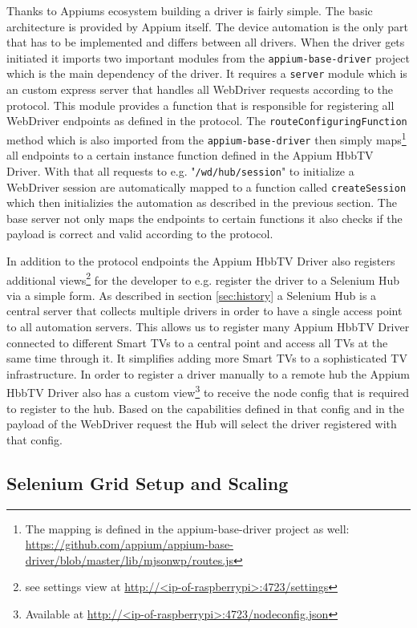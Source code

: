 Thanks to Appiums ecosystem building a driver is fairly simple. The basic architecture is provided by Appium itself.
The device automation is the only part that has to be implemented and differs between all drivers. When the driver
gets initiated it imports two important modules from the \texttt{appium-base-driver} project which is the main
dependency of the driver. It requires a \texttt{server} module which is an custom express server that handles
all WebDriver requests according to the protocol. This module provides a function that is responsible for registering
all WebDriver endpoints as defined in the protocol. The \texttt{routeConfiguringFunction} method which is also
imported from the \texttt{appium-base-driver} then simply maps\footnote{The mapping is defined in the appium-base-driver
project as well: \url{https://github.com/appium/appium-base-driver/blob/master/lib/mjsonwp/routes.js}} all endpoints
to a certain instance function defined in the Appium HbbTV Driver. With that all requests to e.g. "\texttt{/wd/hub/session}"
to initialize a WebDriver session are automatically mapped to a function called \texttt{createSession} which then
initializies the automation as described in the previous section. The base server not only maps the endpoints to
certain functions it also checks if the payload is correct and valid according to the protocol.

In addition to the protocol endpoints the Appium HbbTV Driver also registers additional views\footnote{see settings
view at \url{http://<ip-of-raspberrypi>:4723/settings}} for the developer to e.g. register the driver to a
Selenium Hub via a simple form. As described in section \ref{sec:history} a Selenium Hub is a central server that
collects multiple drivers in order to have a single access point to all automation servers. This allows us to register
many Appium HbbTV Driver connected to different Smart TVs to a central point and access all TVs at the same time
through it. It simplifies adding more Smart TVs to a sophisticated TV infrastructure. In order to register a driver
manually to a remote hub the Appium HbbTV Driver also has a custom view\footnote{Available at
\url{http://<ip-of-raspberrypi>:4723/nodeconfig.json}} to receive the node config that is required to register to the
hub. Based on the capabilities defined in that config and in the payload of the WebDriver request the Hub will select
the driver registered with that config.

\subsection{Selenium Grid Setup and Scaling\label{sec:setupscaling}}

